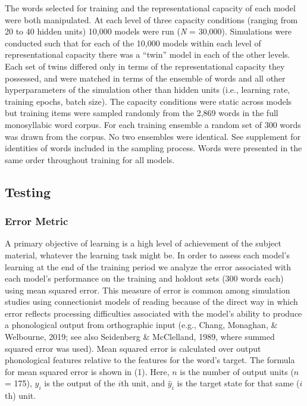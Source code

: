 \documentclass[
  ,man,floatsintext]{apa6}
\begin{document}
The words selected for training and the representational capacity of each model were both manipulated. At each level of three capacity conditions (ranging from 20 to 40 hidden units) 10,000 models were run (\emph{N} = 30,000). Simulations were conducted such that for each of the 10,000 models within each level of representational capacity there was a ``twin'' model in each of the other levels. Each set of twins differed only in terms of the representational capacity they possessed, and were matched in terms of the ensemble of words and all other hyperparameters of the simulation other than hidden units (i.e., learning rate, training epochs, batch size). The capacity conditions were static across models but training items were sampled randomly from the 2,869 words in the full monosyllabic word corpus. For each training ensemble a random set of 300 words was drawn from the corpus. No two ensembles were identical. See supplement for identities of words included in the sampling process. Words were presented in the same order throughout training for all models.

\subsection{Testing}\label{testing}

\subsubsection{Error Metric}\label{error-metric}

A primary objective of learning is a high level of achievement of the subject material, whatever the learning task might be. In order to assess each model's learning at the end of the training period we analyze the error associated with each model's performance on the training and holdout sets (300 words each) using mean squared error. This measure of error is common among simulation studies using connectionist models of reading because of the direct way in which error reflects processing difficulties associated with the model's ability to produce a phonological output from orthographic input (e.g., Chang, Monaghan, \& Welbourne, 2019; see also Seidenberg \& McClelland, 1989, where summed squared error was used). Mean squared error is calculated over output phonological features relative to the features for the word's target. The formula for mean squared error is shown in (1). Here, \(n\) is the number of output units (\(n\) = 175), \(y_i\) is the output of the \(i\)th unit, and \(\hat{y}_i\) is the target state for that same (\(i\)th) unit.
\end{document}
